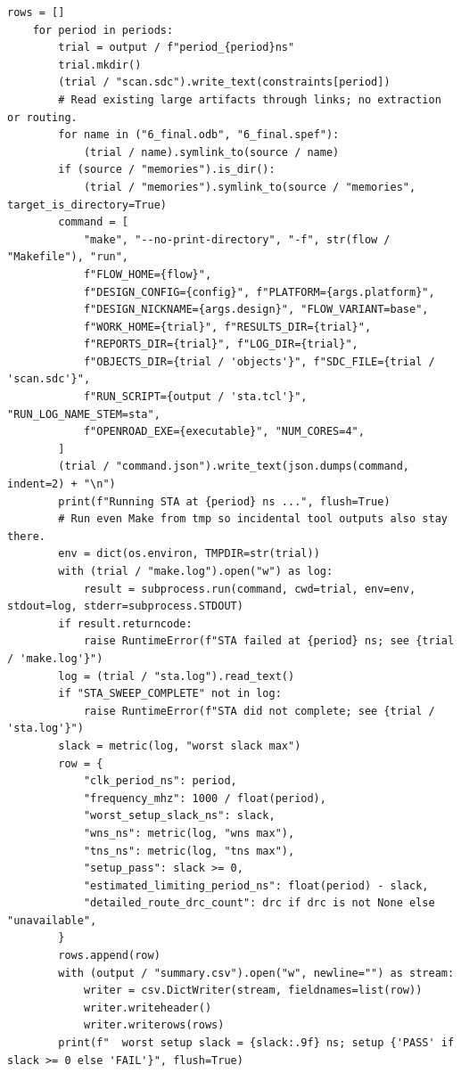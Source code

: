 \documentclass[UTF8,a4paper,11pt,fontset=fandol]{ctexart}
\begin{document}
\begin{lstlisting}[style=script]
    rows = []
    for period in periods:
        trial = output / f"period_{period}ns"
        trial.mkdir()
        (trial / "scan.sdc").write_text(constraints[period])
        # Read existing large artifacts through links; no extraction or routing.
        for name in ("6_final.odb", "6_final.spef"):
            (trial / name).symlink_to(source / name)
        if (source / "memories").is_dir():
            (trial / "memories").symlink_to(source / "memories", target_is_directory=True)
        command = [
            "make", "--no-print-directory", "-f", str(flow / "Makefile"), "run",
            f"FLOW_HOME={flow}",
            f"DESIGN_CONFIG={config}", f"PLATFORM={args.platform}",
            f"DESIGN_NICKNAME={args.design}", "FLOW_VARIANT=base",
            f"WORK_HOME={trial}", f"RESULTS_DIR={trial}",
            f"REPORTS_DIR={trial}", f"LOG_DIR={trial}",
            f"OBJECTS_DIR={trial / 'objects'}", f"SDC_FILE={trial / 'scan.sdc'}",
            f"RUN_SCRIPT={output / 'sta.tcl'}", "RUN_LOG_NAME_STEM=sta",
            f"OPENROAD_EXE={executable}", "NUM_CORES=4",
        ]
        (trial / "command.json").write_text(json.dumps(command, indent=2) + "\n")
        print(f"Running STA at {period} ns ...", flush=True)
        # Run even Make from tmp so incidental tool outputs also stay there.
        env = dict(os.environ, TMPDIR=str(trial))
        with (trial / "make.log").open("w") as log:
            result = subprocess.run(command, cwd=trial, env=env, stdout=log, stderr=subprocess.STDOUT)
        if result.returncode:
            raise RuntimeError(f"STA failed at {period} ns; see {trial / 'make.log'}")
        log = (trial / "sta.log").read_text()
        if "STA_SWEEP_COMPLETE" not in log:
            raise RuntimeError(f"STA did not complete; see {trial / 'sta.log'}")
        slack = metric(log, "worst slack max")
        row = {
            "clk_period_ns": period,
            "frequency_mhz": 1000 / float(period),
            "worst_setup_slack_ns": slack,
            "wns_ns": metric(log, "wns max"),
            "tns_ns": metric(log, "tns max"),
            "setup_pass": slack >= 0,
            "estimated_limiting_period_ns": float(period) - slack,
            "detailed_route_drc_count": drc if drc is not None else "unavailable",
        }
        rows.append(row)
        with (output / "summary.csv").open("w", newline="") as stream:
            writer = csv.DictWriter(stream, fieldnames=list(row))
            writer.writeheader()
            writer.writerows(rows)
        print(f"  worst setup slack = {slack:.9f} ns; setup {'PASS' if slack >= 0 else 'FAIL'}", flush=True)


\end{lstlisting}
\end{document}
